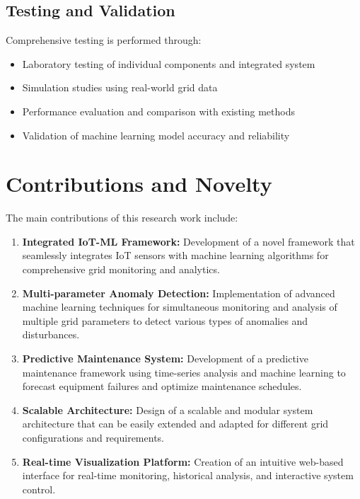 \subsection{Testing and Validation}
Comprehensive testing is performed through:
\begin{itemize}
\item Laboratory testing of individual components and integrated system
\item Simulation studies using real-world grid data
\item Performance evaluation and comparison with existing methods
\item Validation of machine learning model accuracy and reliability
\end{itemize}

\section{Contributions and Novelty}
\label{sec:contributions}

The main contributions of this research work include:

\begin{enumerate}
\item \textbf{Integrated IoT-ML Framework:} Development of a novel framework that seamlessly integrates IoT sensors with machine learning algorithms for comprehensive grid monitoring and analytics.

\item \textbf{Multi-parameter Anomaly Detection:} Implementation of advanced machine learning techniques for simultaneous monitoring and analysis of multiple grid parameters to detect various types of anomalies and disturbances.

\item \textbf{Predictive Maintenance System:} Development of a predictive maintenance framework using time-series analysis and machine learning to forecast equipment failures and optimize maintenance schedules.

\item \textbf{Scalable Architecture:} Design of a scalable and modular system architecture that can be easily extended and adapted for different grid configurations and requirements.

\item \textbf{Real-time Visualization Platform:} Creation of an intuitive web-based interface for real-time monitoring, historical analysis, and interactive system control.
\end{enumerate}

